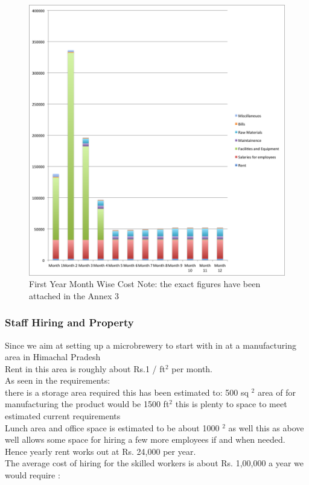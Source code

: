 \documentclass[11pt]{article}
\begin{document}
	\begin{figure}[h!]
	\caption{First Year Month Wise Cost \newline Note: the exact figures have been attached in the Annex 3}
	\centering
	\includegraphics[width=\textwidth]{monthWiseCost.png}
	\end{figure}


      \subsubsection{Staff Hiring and Property}
Since we aim at setting up a microbrewery to start with in at a manufacturing area in Himachal Pradesh \\
Rent in this area is roughly about Rs.1 / ft$^2$ per month. \\
As seen in the requirements: \\
there is a storage area required this has been estimated to: 500 sq $^2$ area of for manufacturing the product would be 1500 ft$^2$ this is plenty to space to meet estimated current requirements \\
Lunch area and office space is estimated to be about 1000 $^2$ as well this as above well allows some space for hiring a few more employees if and when needed. \\
Hence yearly rent works out at Rs. 24,000 per year. \\
The average cost of hiring for the skilled workers is about Rs. 1,00,000 a year we would require :
\end{document}
